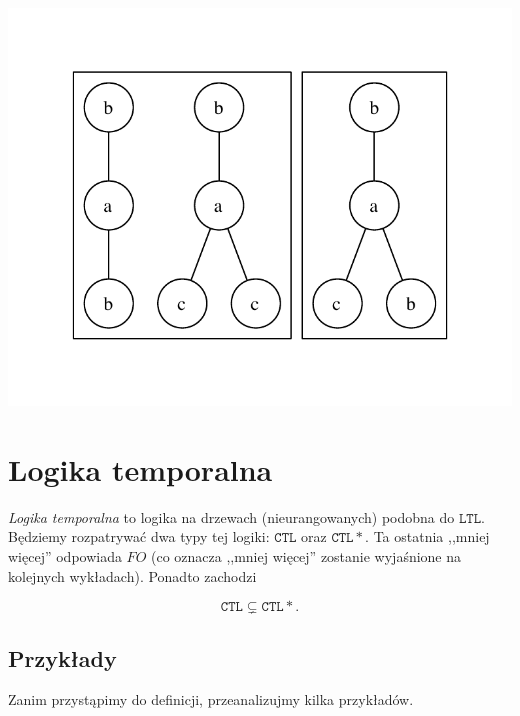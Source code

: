 \begin{przyklad}
	\begin{center}
		\includegraphics[scale=0.6]{rysunki/w12-l_prim.pdf}
	\end{center}

\end{przyklad}

\section{Logika temporalna} %
\label{sec:logika_temporalna}

\newcommand{\LTL}{\ensuremath{\mathtt{LTL}}}
\newcommand{\CTL}{\ensuremath{\mathtt{CTL}}}
\newcommand{\CTLS}{\ensuremath{\mathtt{CTL*}}}
\newcommand{\opA}{\ensuremath{\mathrm{A}}}
\newcommand{\opE}{\ensuremath{\mathrm{E}}}

\textit{Logika temporalna} to logika na drzewach (nieurangowanych) podobna do $\LTL$. Będziemy rozpatrywać dwa typy tej logiki: $\CTL$ oraz $\CTLS$. Ta ostatnia ,,mniej więcej'' odpowiada $FO$ (co oznacza ,,mniej więcej'' zostanie wyjaśnione na kolejnych wykładach). Ponadto zachodzi

$$\CTL \subsetneq \CTLS.$$

\subsection{Przykłady} %
\label{sub:przyklady}

Zanim przystąpimy do definicji, przeanalizujmy kilka przykładów.


